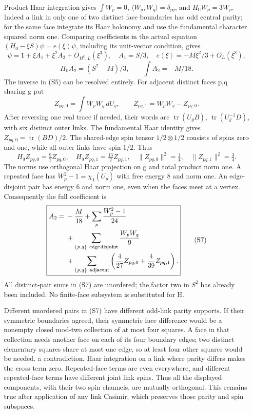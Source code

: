 Product Haar integration gives \(\int W_p=0\), \(\langle W_p,W_q\rangle=\delta_{pq}\), and \(H_0W_p=3W_p\). Indeed a link in only one of two distinct face boundaries has odd central parity; for the same face integrate its Haar holonomy and use the fundamental character squared norm one. Comparing coefficients in the actual equation \((H_0-\xi S)\psi=e(\xi)\psi\), including its unit-vector condition, gives \[
 \psi=1+\xi A_1+\xi^2A_2+O_{H^k,L}(\xi^3),\quad A_1=S/3,
 \quad e(\xi)=-M\xi^2/3+O_L(\xi^3),
\] \[
 H_0A_2=(S^2-M)/3,\qquad\int A_2=-M/18.
\tag{S5}
\] The inverse in (S5) can be resolved entirely. For adjacent distinct faces p,q sharing g put \[
 Z_{pq,0}=\int W_pW_q\,dU_g,\qquad
 Z_{pq,1}=W_pW_q-Z_{pq,0}.
\] After reversing one real trace if needed, their words are \(\operatorname{tr}(U_gB)\), \(\operatorname{tr}(U_g^{-1}D)\), with six distinct outer links. The fundamental Haar identity gives \(Z_{pq,0}=\operatorname{tr}(BD)/2\). The shared-edge spin tensor \(1/2\otimes1/2\) consists of spins zero and one, while all outer links have spin \(1/2\). Thus \[
 H_0Z_{pq,0}=\tfrac92 Z_{pq,0},\quad
 H_0Z_{pq,1}=\tfrac{13}2Z_{pq,1},\quad
 \|Z_{pq,0}\|^2=\tfrac14,\quad\|Z_{pq,1}\|^2=\tfrac34.
\tag{S6}
\] The norms use orthogonal Haar projection on g and total product norm one. A repeated face has \(W_p^2-1=\chi_1(U_p)\) with free energy 8 and norm one. An edge-disjoint pair has energy 6 and norm one, even when the faces meet at a vertex. Consequently the full coefficient is \[
 \boxed{\begin{aligned} A_2={}&-\frac M{18}+\sum_p\frac{W_p^2-1}{24}\\
 &+\sum_{\{p,q\}\ {\rm edge\!\!-\!\!disjoint}}\frac{W_pW_q}{9}\\
 &+\sum_{\{p,q\}\ {\rm adjacent}}
       \left(\frac4{27}Z_{pq,0}+\frac4{39}Z_{pq,1}\right).\end{aligned}}
\tag{S7}
\] All distinct-pair sums in (S7) are unordered; the factor two in \(S^2\) has already been included. No finite-face subsystem is substituted for H.

Different unordered pairs in (S7) have different odd-link parity supports. If their symmetric boundaries agreed, their symmetric face difference would be a nonempty closed mod-two collection of at most four squares. A face in that collection needs another face on each of its four boundary edges; two distinct elementary squares share at most one edge, so at least four other squares would be needed, a contradiction. Haar integration on a link where parity differs makes the cross term zero. Repeated-face terms are even everywhere, and different repeated-face terms have different joint link spins. Thus all the displayed components, with their two spin channels, are mutually orthogonal. This remains true after application of any link Casimir, which preserves those parity and spin subspaces.

